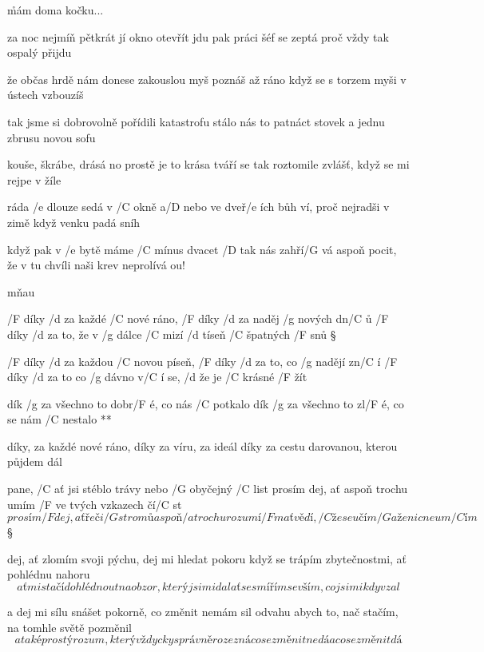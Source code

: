 \r mám doma kočku...

za noc nejmíň pětkrát jí okno otevřít jdu
pak práci šéf se zeptá proč vždy tak ospalý přijdu \s

že občas hrdě nám donese zakouslou myš
poznáš až ráno když se s torzem myši v ústech vzbouzíš \s

tak jsme si dobrovolně pořídili katastrofu
stálo nás to patnáct stovek a jednu zbrusu novou sofu \s

kouše, škrábe, drásá no prostě je to krása
tváří se tak roztomile zvlášť, když se mi rejpe v žíle

\rr \songgg

ráda /e dlouze sedá v /C okně a/D nebo ve dveř/e ích
bůh ví, proč nejradši v zimě když venku padá sníh

když pak v /e bytě máme /C mínus dvacet /D tak nás zahří/G vá
aspoň pocit, že v tu chvíli naši krev neprolívá
ou!

\rr

mňau




/F díky /d za každé /C nové ráno, /F díky /d za naděj /g nových dn/C ů
/F díky /d za to, že v /g dálce /C mizí /d tíseň /C špatných /F snů \S

/F díky /d za každou /C novou píseň, /F díky /d za to, co /g nadějí zn/C í
/F díky /d za to co /g dávno v/C í se, /d že je /C krásné /F žít

\R dík /g za všechno to dobr/F é, co nás /C potkalo
   dík /g za všechno to zl/F é, co se nám /C nestalo **

díky, za každé nové ráno, díky za víru, za ideál
díky za cestu darovanou, kterou půjdem dál



pane, /C ať jsi stéblo trávy nebo /G obyčejný /C list
prosím dej, ať aspoň trochu umím /F ve tvých vzkazech čí/C st
\[ prosím /F dej, ať řeči /G stromů aspoň /a trochu rozumí/F m
ať vědí, /C že se učím /G a že nic neum/C ím \] \S

dej, ať zlomím svoji pýchu, dej mi hledat pokoru
když se trápím zbytečnostmi, ať pohlédnu nahoru
\[ ať mi stačí dohlédnout na obzor, který jsi mi dal
ať se smířím se vším, co jsi mi kdy vzal \] \s

a dej mi sílu snášet pokorně, co změnit nemám sil
odvahu abych to, nač stačím, na tomhle světě pozměnil
\[ a také prostý rozum, který vždycky správně rozezná
co se změnit nedá a co se změnit dá \]


